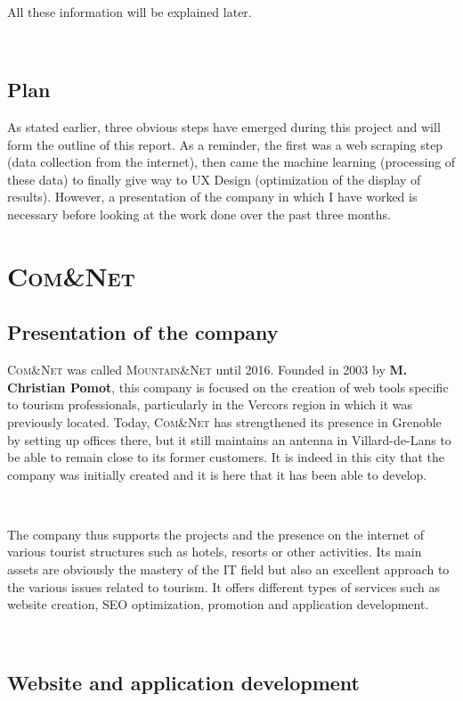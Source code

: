 \documentclass[12pt]{article}
\begin{document}
\

All these information will be explained later.

\

\subsection{Plan}

As stated earlier, three obvious steps have emerged during this project and will form the outline of this report. As a reminder, the first was a web scraping step (data collection from the internet), then came the machine learning (processing of these data) to finally give way to UX Design (optimization of the display of results). However, a presentation of the company in which I have worked is necessary before looking at the work done over the past three months.



\newpage
\section{\textsc{Com\&Net}}

\subsection{Presentation of the company}

\textsc{Com\&Net} was called \textsc{Mountain\&Net} until 2016. Founded in 2003 by \textbf{M. Christian Pomot}, this company is focused on the creation of web tools specific to tourism professionals, particularly in the Vercors region in which it was previously located. Today, \textsc{Com\&Net} has strengthened its presence in Grenoble by setting up offices there, but it still maintains an antenna in Villard-de-Lans to be able to remain close to its former customers. It is indeed in this city that the company was initially created and it is here that it has been able to develop.

\

The company thus supports the projects and the presence on the internet of various tourist structures such as hotels, resorts or other activities. Its main assets are obviously the mastery of the IT field but also an excellent approach to the various issues related to tourism. It offers different types of services such as website creation, SEO optimization, promotion and application development.

\

\subsection{Website and application development}
\end{document}
